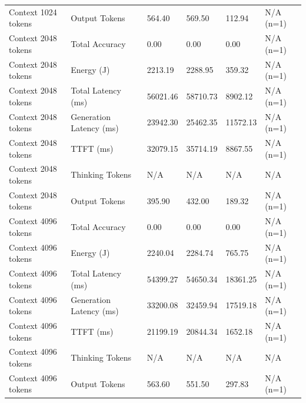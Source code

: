 \begin{table}
\begin{tabular}{llllll}
Context 1024 tokens & Output Tokens & 564.40 & 569.50 & 112.94 & N/A (n=1) \\
Context 2048 tokens & Total Accuracy & 0.00 & 0.00 & 0.00 & N/A (n=1) \\
Context 2048 tokens & Energy (J) & 2213.19 & 2288.95 & 359.32 & N/A (n=1) \\
Context 2048 tokens & Total Latency (ms) & 56021.46 & 58710.73 & 8902.12 & N/A (n=1) \\
Context 2048 tokens & Generation Latency (ms) & 23942.30 & 25462.35 & 11572.13 & N/A (n=1) \\
Context 2048 tokens & TTFT (ms) & 32079.15 & 35714.19 & 8867.55 & N/A (n=1) \\
Context 2048 tokens & Thinking Tokens & N/A & N/A & N/A & N/A \\
Context 2048 tokens & Output Tokens & 395.90 & 432.00 & 189.32 & N/A (n=1) \\
Context 4096 tokens & Total Accuracy & 0.00 & 0.00 & 0.00 & N/A (n=1) \\
Context 4096 tokens & Energy (J) & 2240.04 & 2284.74 & 765.75 & N/A (n=1) \\
Context 4096 tokens & Total Latency (ms) & 54399.27 & 54650.34 & 18361.25 & N/A (n=1) \\
Context 4096 tokens & Generation Latency (ms) & 33200.08 & 32459.94 & 17519.18 & N/A (n=1) \\
Context 4096 tokens & TTFT (ms) & 21199.19 & 20844.34 & 1652.18 & N/A (n=1) \\
Context 4096 tokens & Thinking Tokens & N/A & N/A & N/A & N/A \\
Context 4096 tokens & Output Tokens & 563.60 & 551.50 & 297.83 & N/A (n=1) \\
\bottomrule
\end{tabular}
\end{table}
